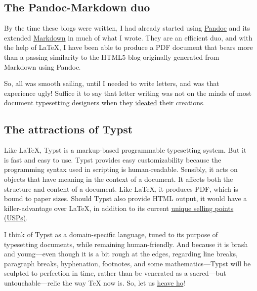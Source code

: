 \documentclass[
  a4paper,
]{article}
\begin{document}
\hypertarget{the-pandoc-markdown-duo}{%
\subsection{The Pandoc-Markdown duo}\label{the-pandoc-markdown-duo}}

By the time these blogs were written, I had already started using
\href{https://pandoc.org/}{Pandoc} and its extended
\href{https://pandoc.org/chunkedhtml-demo/8-pandocs-markdown.html}{Markdown}
in much of what I wrote. They are an efficient duo, and with the help of
LaTeX, I have been able to produce a PDF document that bears more than a
passing similarity to the HTML5 blog originally generated from Markdown
using Pandoc.

So, all was smooth sailing, until I needed to write letters, and was
that experience ugly! Suffice it to say that letter writing was not on
the minds of most document typesetting designers when they
\href{https://www.thefreedictionary.com/ideated}{ideated} their
creations.

\hypertarget{the-attractions-of-typst}{%
\subsection{The attractions of Typst}\label{the-attractions-of-typst}}

Like LaTeX, Typst is a markup-based programmable typesetting system. But
it is fast and easy to use. Typst provides easy customizability because
the programming syntax used in scripting is human-readable. Sensibly, it
acts on objects that have meaning in the context of a document. It
affects both the structure and content of a document. Like LaTeX, it
produces PDF, which is bound to paper sizes. Should Typst also provide
HTML output, it would have a killer-advantage over LaTeX, in addition to
its current
\href{https://www.techtarget.com/whatis/definition/unique-selling-point-USP}{unique
selling points (USPs)}.

I think of Typst as a domain-specific language, tuned to its purpose of
typesetting documents, while remaining human-friendly. And because it is
brash and young---even though it is a bit rough at the edges, regarding
line breaks, paragraph breaks, hyphenation, footnotes, and some
mathematics---Typst will be sculpted to perfection in time, rather than
be venerated as a sacred---but untouchable---relic the way TeX now is.
So, let us
\href{https://www.collinsdictionary.com/us/dictionary/english/heave-ho}{heave
ho}!
\end{document}
